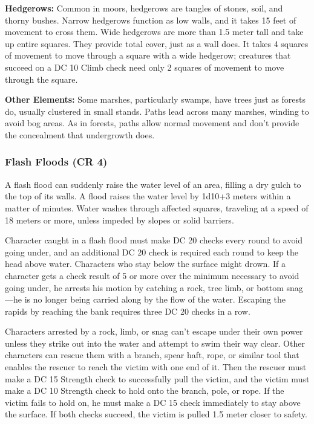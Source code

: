 \textbf{Hedgerows:} Common in moors, hedgerows are tangles of stones, soil, and thorny bushes. Narrow hedgerows function as low walls, and it takes 15 feet of movement to cross them. Wide hedgerows are more than 1.5 meter tall and take up entire squares. They provide total cover, just as a wall does. It takes 4 squares of movement to move through a square with a wide hedgerow; creatures that succeed on a DC 10 Climb check need only 2 squares of movement to move through the square.


\textbf{Other Elements:} Some marshes, particularly swamps, have trees just as forests do, usually clustered in small stands. Paths lead across many marshes, winding to avoid bog areas. As in forests, paths allow normal movement and don't provide the concealment that undergrowth does.



\subsubsection{Flash Floods (CR 4)}
A flash flood can suddenly raise the water level of an area, filling a dry gulch to the top of its walls. A flood raises the water level by 1d10+3 meters within a matter of minutes. Water washes through affected squares, traveling at a speed of 18 meters or more, unless impeded by slopes or solid barriers.

Character caught in a flash flood must make DC 20  checks every round to avoid going under, and an additional DC 20  check is required each round to keep the head above water. Characters who stay below the surface might drown. If a character gets a check result of 5 or more over the minimum necessary to avoid going under, he arrests his motion by catching a rock, tree limb, or bottom snag---he is no longer being carried along by the flow of the water. Escaping the rapids by reaching the bank requires three DC 20  checks in a row. 

Characters arrested by a rock, limb, or snag can't escape under their own power unless they strike out into the water and attempt to swim their way clear. Other characters can rescue them with a branch, spear haft, rope, or similar tool that enables the rescuer to reach the victim with one end of it. Then the rescuer must make a DC 15 Strength check to successfully pull the victim, and the victim must make a DC 10 Strength check to hold onto the branch, pole, or rope. If the victim fails to hold on, he must make a DC 15  check immediately to stay above the surface. If both checks succeed, the victim is pulled 1.5 meter closer to safety.


